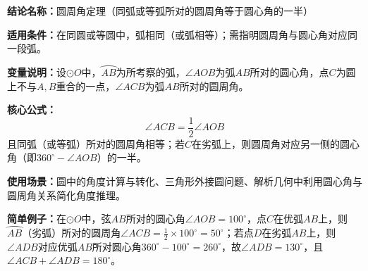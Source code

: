 \textbf{结论名称：}圆周角定理（同弧或等弧所对的圆周角等于圆心角的一半）

\textbf{适用条件：}在同圆或等圆中，弧相同（或弧相等）；需指明圆周角与圆心角对应同一段弧。

\textbf{变量说明：}设$\odot O$中，$\wideparen{AB}$为所考察的弧，$\angle AOB$为弧$AB$所对的圆心角，点$C$为圆上不与$A,B$重合的一点，$\angle ACB$为弧$AB$所对的圆周角。

\textbf{核心公式：}
\[
\boxed{\angle ACB = \frac{1}{2}\angle AOB}
\]
且同弧（或等弧）所对的圆周角相等；若$C$在劣弧上，则圆周角对应另一侧的圆心角（即$360^\circ-\angle AOB$）的一半。

\textbf{使用场景：}圆中的角度计算与转化、三角形外接圆问题、解析几何中利用圆心角与圆周角关系简化角度推理。

\textbf{简单例子：}在$\odot O$中，弦$AB$所对的圆心角$\angle AOB=100^\circ$，点$C$在优弧$AB$上，则$\wideparen{AB}$（劣弧）所对的圆周角$\angle ACB = \frac{1}{2}\times 100^\circ = 50^\circ$；若点$D$在劣弧$AB$上，则$\angle ADB$对应优弧$AB$所对圆心角$360^\circ-100^\circ=260^\circ$，故$\angle ADB = 130^\circ$，且$\angle ACB + \angle ADB = 180^\circ$。